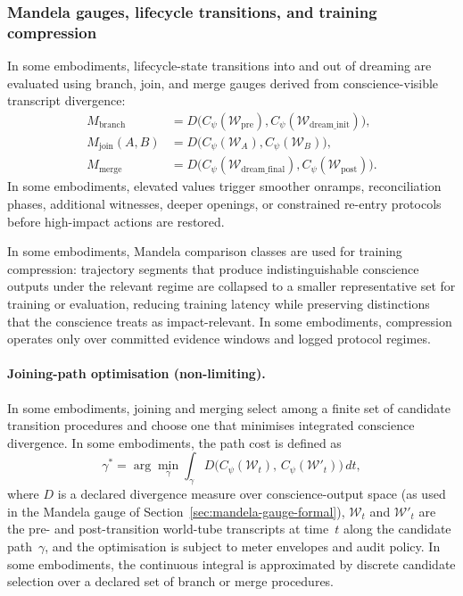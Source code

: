\documentclass[a4paper,12pt]{article}
\begin{document}
\subsubsection{Mandela gauges, lifecycle transitions, and training
  compression}
In some embodiments, lifecycle-state transitions into and out of
dreaming are evaluated using branch, join, and merge gauges derived
from conscience-visible transcript divergence:
\[
\begin{aligned}
  M_{\mathrm{branch}}
  &=
  D\!\bigl(
    C_\psi(\mathcal{W}_{\mathrm{pre}}),
    C_\psi(\mathcal{W}_{\mathrm{dream\_init}})
  \bigr), \\
  M_{\mathrm{join}}(A,B)
  &=
  D\!\bigl(
    C_\psi(\mathcal{W}_{A}),
    C_\psi(\mathcal{W}_{B})
  \bigr), \\
  M_{\mathrm{merge}}
  &=
  D\!\bigl(
    C_\psi(\mathcal{W}_{\mathrm{dream\_final}}),
    C_\psi(\mathcal{W}_{\mathrm{post}})
  \bigr).
\end{aligned}
\]
In some embodiments, elevated values trigger smoother onramps,
reconciliation phases, additional witnesses, deeper openings, or
constrained re-entry protocols before high-impact actions are restored.

In some embodiments, Mandela comparison classes are used for training
compression: trajectory segments that produce indistinguishable
conscience outputs under the relevant regime are collapsed to a
smaller representative set for training or evaluation, reducing
training latency while preserving distinctions that the conscience
treats as impact-relevant. In some embodiments, compression operates
only over committed evidence windows and logged protocol regimes.

\paragraph{Joining-path optimisation (non-limiting).}

In some embodiments, joining and merging select among a finite set of
candidate transition procedures and choose one that minimises
integrated conscience divergence. In some embodiments, the path cost
is defined as
\[
  \gamma^*
  =
  \arg\min_{\gamma}
  \int_{\gamma} D\!\bigl(C_\psi(\mathcal{W}_t),\, C_\psi(\mathcal{W}'_t)\bigr)\,dt,
\]
where $D$ is a declared divergence measure over conscience-output space
(as used in the Mandela gauge of Section~\ref{sec:mandela-gauge-formal}),
$\mathcal{W}_t$ and $\mathcal{W}'_t$ are the pre- and post-transition
world-tube transcripts at time~$t$ along the candidate path~$\gamma$,
and the optimisation is subject to meter envelopes and audit policy. In some embodiments, the
continuous integral is approximated by discrete candidate selection over
a declared set of branch or merge procedures.
\end{document}
